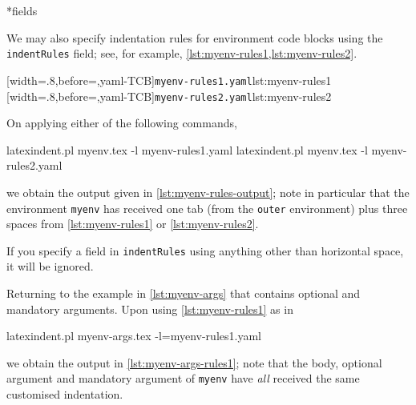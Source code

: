 \documentclass[10pt]{article}
\begin{document}
*{fields}
 \begin{example}
 We may also specify indentation rules for environment code blocks using the
 \texttt{indentRules} field; see, for example, \cref{lst:myenv-rules1,lst:myenv-rules2}.

 \begin{cmhtcbraster}[raster column skip=.1\linewidth]
  [width=.8\linewidth,before=\centering,yaml-TCB]{\texttt{myenv-rules1.yaml}}{lst:myenv-rules1}
  [width=.8\linewidth,before=\centering,yaml-TCB]{\texttt{myenv-rules2.yaml}}{lst:myenv-rules2}
 \end{cmhtcbraster}

 On applying either of the following commands, 

 \begin{commandshell}
latexindent.pl myenv.tex -l myenv-rules1.yaml  
latexindent.pl myenv.tex -l myenv-rules2.yaml  
\end{commandshell}

 we obtain the output given in \cref{lst:myenv-rules-output}; note in particular that the
 environment \texttt{myenv} has received one tab (from the \texttt{outer} environment)
 plus three spaces from \cref{lst:myenv-rules1} or \ref{lst:myenv-rules2}.

 \end{example}

 If you specify a field in \texttt{indentRules} using anything other than horizontal
 space, it will be ignored.

 \begin{example}
 Returning to the example in \cref{lst:myenv-args} that contains optional and mandatory
 arguments. Upon using \cref{lst:myenv-rules1} as in 

 \begin{commandshell}
latexindent.pl myenv-args.tex -l=myenv-rules1.yaml  
\end{commandshell}

 we obtain the output in \cref{lst:myenv-args-rules1}; note that the body, optional
 argument and mandatory argument of \texttt{myenv} have \emph{all} received the same
 customised indentation.
 \end{example}
\end{document}
